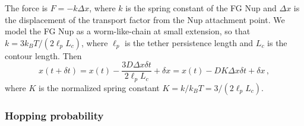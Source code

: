 The force is $F = -k\Delta x$, where $k$ is the spring constant of the FG Nup and $\Delta x$ is the displacement of the transport factor from the Nup attachment point.  We model the FG Nup as a worm-like-chain at small extension, so that $k = 3 k_B T/(2\ell_pL_c)$, where $\ell_p$ is the tether persistence length and $L_c$ is the contour length.  Then 
\begin{equation}
  x(t+\delta t) = x(t) - \frac{3 D \Delta x \delta t}{2\ell_p L_c }+
  \delta x = x(t) - D K \Delta x \delta t+ \delta x\,,
\end{equation}
where $K$ is the normalized spring constant $K = k/k_B T = 3/(2 \ell_p L_c)$.

\subsubsection{Hopping probability}

